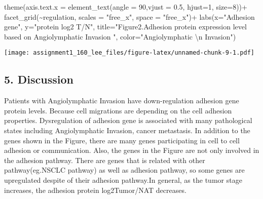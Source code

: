 \documentclass[
]{article}
\newenvironment{Shaded}{\begin{snugshade}}{\end{snugshade}}
\newcommand{\AttributeTok}[1]{\textcolor[rgb]{0.77,0.63,0.00}{#1}}
\newcommand{\DecValTok}[1]{\textcolor[rgb]{0.00,0.00,0.81}{#1}}
\newcommand{\FloatTok}[1]{\textcolor[rgb]{0.00,0.00,0.81}{#1}}
\newcommand{\FunctionTok}[1]{\textcolor[rgb]{0.00,0.00,0.00}{#1}}
\newcommand{\NormalTok}[1]{#1}
\newcommand{\SpecialCharTok}[1]{\textcolor[rgb]{0.00,0.00,0.00}{#1}}
\newcommand{\StringTok}[1]{\textcolor[rgb]{0.31,0.60,0.02}{#1}}
\begin{document}
\begin{Shaded}
\begin{Highlighting}[]
  \FunctionTok{theme}\NormalTok{(}\AttributeTok{axis.text.x =} \FunctionTok{element\_text}\NormalTok{(}\AttributeTok{angle =} \DecValTok{90}\NormalTok{,}\AttributeTok{vjust =} \FloatTok{0.5}\NormalTok{, }\AttributeTok{hjust=}\DecValTok{1}\NormalTok{, }\AttributeTok{size=}\DecValTok{8}\NormalTok{))}\SpecialCharTok{+}
  \FunctionTok{facet\_grid}\NormalTok{(}\SpecialCharTok{\textasciitilde{}}\NormalTok{regulation, }\AttributeTok{scales =} \StringTok{"free\_x"}\NormalTok{, }\AttributeTok{space =} \StringTok{"free\_x"}\NormalTok{)}\SpecialCharTok{+}
  \FunctionTok{labs}\NormalTok{(}\AttributeTok{x=}\StringTok{"Adhesion gene"}\NormalTok{,}
       \AttributeTok{y=}\StringTok{"protein log2 T/N"}\NormalTok{,}
       \AttributeTok{title=}\StringTok{"Figure2.Adhesion protein expression level based on Angiolymphatic Invasion "}\NormalTok{,}
       \AttributeTok{color=}\StringTok{"Angiolymphatic }\SpecialCharTok{\textbackslash{}n}\StringTok{ Invasion"}\NormalTok{)}
\end{Highlighting}
\end{Shaded}

\texttt{[image: assignment1\_160\_lee\_files/figure-latex/unnamed-chunk-9-1.pdf]}

\hypertarget{discussion}{%
\subsection{5. Discussion}\label{discussion}}

Patients with Angiolymphatic Invasion have down-regulation adhesion gene
protein levels. Because cell migrations are depending on the cell
adhesion properties. Dysregulation of adhesion gene is associated with
many pathological states including Angiolymphatic Invasion, cancer
metastasis. In addition to the genes shown in the Figure, there are many
genes participating in cell to cell adhesion or communication. Also, the
genes in the Figure are not only involved in the adhesion pathway. There
are genes that is related with other pathway(eg.NSCLC pathway) as well
as adhesion pathway, so some genes are upregulated despite of their
adhesion pathway.In general, as the tumor stage increases, the adhesion
protein log2Tumor/NAT decreases.
\end{document}
